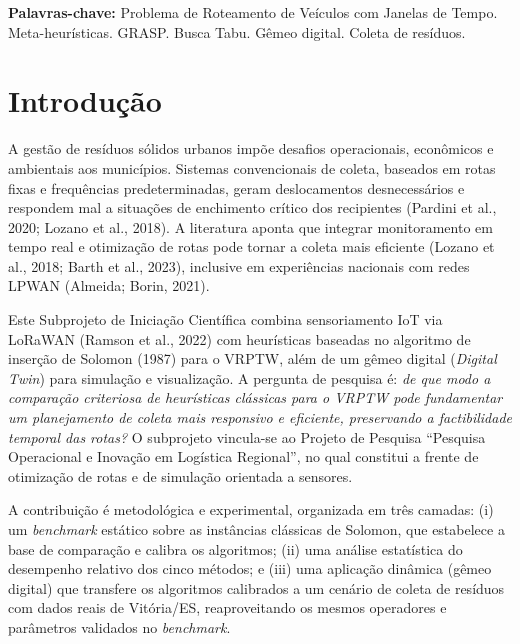 \documentclass[10pt,a4paper]{article}
\newcommand{\tituloProjeto}{Pesquisa Operacional e Inovação em Logística Regional}
\begin{document}
\vspace{\baselineskip}
\textbf{Palavras-chave:} Problema de Roteamento de Veículos com Janelas de Tempo. Meta-heurísticas. GRASP. Busca Tabu. Gêmeo digital. Coleta de resíduos.

\section{Introdução}
A gestão de resíduos sólidos urbanos impõe desafios operacionais, econômicos e ambientais aos municípios. Sistemas convencionais de coleta, baseados em rotas fixas e frequências predeterminadas, geram deslocamentos desnecessários e respondem mal a situações de enchimento crítico dos recipientes (Pardini et al., 2020; Lozano et al., 2018). A literatura aponta que integrar monitoramento em tempo real e otimização de rotas pode tornar a coleta mais eficiente (Lozano et al., 2018; Barth et al., 2023), inclusive em experiências nacionais com redes LPWAN (Almeida; Borin, 2021).

\vspace{\baselineskip}
Este Subprojeto de Iniciação Científica combina sensoriamento IoT via LoRaWAN (Ramson et al., 2022) com heurísticas baseadas no algoritmo de inserção de Solomon (1987) para o VRPTW, além de um gêmeo digital (\textit{Digital Twin}) para simulação e visualização. A pergunta de pesquisa é: \emph{de que modo a comparação criteriosa de heurísticas clássicas para o VRPTW pode fundamentar um planejamento de coleta mais responsivo e eficiente, preservando a factibilidade temporal das rotas?} O subprojeto vincula-se ao Projeto de Pesquisa ``\tituloProjeto'', no qual constitui a frente de otimização de rotas e de simulação orientada a sensores.

\vspace{\baselineskip}
A contribuição é metodológica e experimental, organizada em três camadas: (i) um \textit{benchmark} estático sobre as instâncias clássicas de Solomon, que estabelece a base de comparação e calibra os algoritmos; (ii) uma análise estatística do desempenho relativo dos cinco métodos; e (iii) uma aplicação dinâmica (gêmeo digital) que transfere os algoritmos calibrados a um cenário de coleta de resíduos com dados reais de Vitória/ES, reaproveitando os mesmos operadores e parâmetros validados no \textit{benchmark}.

\end{document}
